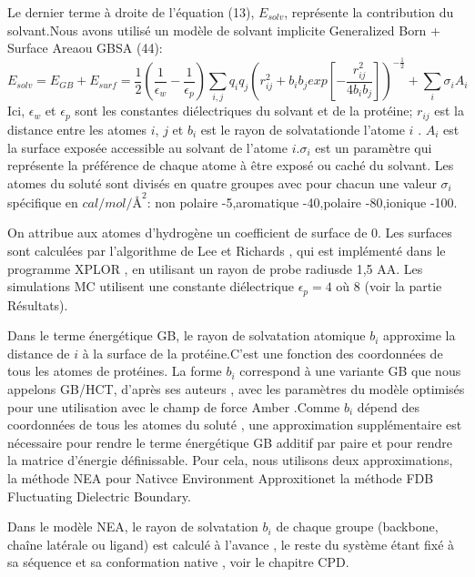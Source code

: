 Le dernier terme à droite de l'équation (13), $E_{solv}$, représente la contribution du solvant.Nous avons utilisé un modèle de solvant implicite \og Generalized Born + Surface Area\fg ou GBSA (44):
\begin{displaymath}
E_{solv} = E_{GB} + E_{surf} = \frac{1}{2}(\frac{1}{\epsilon_w} - \frac{1}{\epsilon_p})\sum_{i,j} q_iq_j (r^2_{ij} + b_ib_jexp[-\frac{r^2_{ij}}{4b_ib_j}])^{-\frac{1}{2}} + \sum_i \sigma_iA_i
\end{displaymath} 
Ici, $\epsilon_w$ et $\epsilon_p$ sont les constantes diélectriques du solvant et de la protéine; $r_{ij}$ est la distance entre les atomes $i$, $j$ et $b_i$ est le \og rayon de solvatation\fg de l'atome $i$ \cite{Hawkins95,Lopes07}. $A_i$ est la surface exposée accessible au solvant de l'atome $i$.$\sigma_i$ est un paramètre qui représente la préférence de chaque atome à être exposé ou caché du solvant. Les atomes du soluté sont divisés en quatre groupes avec pour chacun une valeur $\sigma_i$ spécifique en $cal/mol/Å^2$:
non polaire -5,aromatique -40,polaire -80,ionique -100.

On attribue aux atomes d'hydrogène un coefficient de surface de 0. Les surfaces sont calculées par l'algorithme de Lee et Richards \cite{Lee71},  qui est implémenté dans le programme XPLOR \cite{Xplor}, en utilisant un rayon de \og probe radius\fg de 1,5 {AA}. Les simulations MC utilisent une constante diélectrique $\epsilon_p = 4$ où $8$ (voir la partie Résultats).

Dans le terme énergétique GB, le rayon de solvatation atomique $b_i$ approxime la distance de $i$ à la surface de la protéine.C'est une fonction des coordonnées de tous les atomes de protéines. La forme $b_i$ correspond à une variante GB que nous appelons GB/HCT, d'après ses auteurs \cite{Hawkins95}, avec les paramètres du modèle optimisés pour une utilisation avec le champ de force Amber \cite{Lopes07}.Comme $b_i$ dépend des coordonnées de tous les atomes du soluté \cite{Hawkins95}, une approximation supplémentaire est nécessaire pour rendre le terme énergétique GB additif par paire et pour rendre la matrice d'énergie définissable.
Pour cela, nous utilisons deux approximations, la méthode NEA pour \og Nativce Environment Approxition\fg et la méthode FDB \og Fluctuating Dielectric Boundary\fg \cite{Villa01}.

Dans le modèle NEA, le rayon de solvatation $b_i$ de chaque groupe (backbone, chaîne latérale ou ligand) est calculé à l'avance , le reste du système étant fixé à sa séquence et sa conformation native \cite{Simonson13b,Gaillard14}, voir le chapitre CPD.

